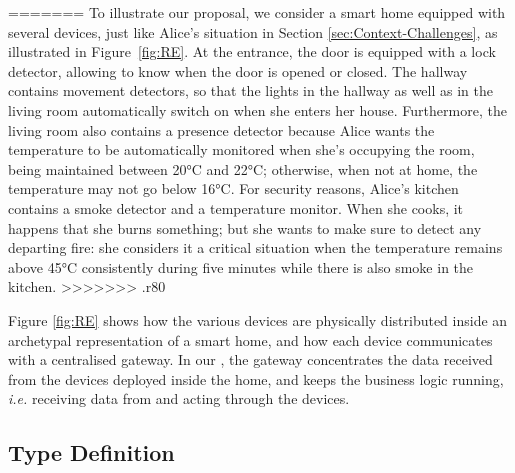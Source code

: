 =======
To illustrate our proposal, we consider a smart home equipped with several devices, just like Alice's situation in Section \ref{sec:Context-Challenges}, as illustrated in Figure~\ref{fig:RE}. At the entrance, the door is equipped with a lock detector, allowing to know when the door is opened or closed. The hallway contains movement detectors, so that the lights in the hallway as well as in the living room automatically switch on when she enters her house. Furthermore, the living room also contains a presence detector because Alice wants the temperature to be automatically monitored when she's occupying the room, being maintained between 20°C and 22°C; otherwise, when not at home, the temperature may not go below 16°C. For security reasons, Alice's kitchen contains a smoke detector and a temperature monitor. When she cooks, it happens that she burns something; but she wants to make sure to detect any departing fire: she considers it a critical situation when the temperature remains above 45°C consistently during five minutes while there is also smoke in the kitchen. 
>>>>>>> .r80

Figure \ref{fig:RE} shows how the various devices are physically distributed inside an archetypal representation of a smart home, and how each device communicates with a centralised gateway. In our \DSL, the gateway concentrates the data received from the devices deployed inside the home, and keeps the business logic running, \textit{i.e.} receiving data from and acting through the devices. 

\subsection{Type Definition}
\label{sec:IoTDSL-Type}

